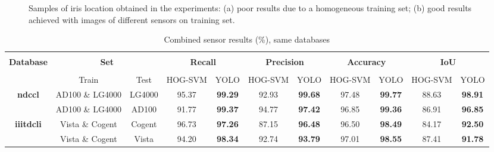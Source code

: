 \documentclass[conference]{IEEEtran}
\begin{document}
\begin{figure}[!htb]
\centering
{} \vspace{-2mm}

\caption{Samples of iris location obtained in the experiments: (a) poor results due to a homogeneous training set; (b) good results achieved with images of different sensors on training set.}
\end{figure}


\begin{table*}[!ht]
	\centering
	\caption{Combined sensor results (\%), same databases}
	\label{tab:combined}
	\begin{tabular}{c c c c c c c c c c c}\hline  \\[\dimexpr-\normalbaselineskip+4pt]

		 \multirow{2}{*}{\textbf{Database}} & \multicolumn{2}{c}{\textbf{Set}} & \multicolumn{2}{c}{\textbf{Recall}} & \multicolumn{2}{c}{\textbf{Precision}} & \multicolumn{2}{c}{\textbf{Accuracy}} & \multicolumn{2}{c}{\textbf{IoU}} \\
		 \\[\dimexpr-\normalbaselineskip+2pt] 
		 
		          & Train & Test  & HOG-SVM & YOLO & HOG-SVM & YOLO & HOG-SVM & YOLO & HOG-SVM & YOLO \\ \toprule

		\multirow{2}{*}{\textbf{\gls*{ndccl}}}     & AD100 \& LG4000 & LG4000  & 95.37  & \textbf{99.29} & 92.93 & \textbf{99.68} & 97.48 & \textbf{99.77} & 88.63 & \textbf{98.91}  \\ 
		                   & AD100 \& LG4000 & AD100   & 91.77  & \textbf{99.37} & 94.77 & \textbf{97.42} & 96.85 & \textbf{99.36} & 86.91 & \textbf{96.85}  \\ \midrule
		\multirow{2}{*}{\textbf{\gls*{iiitdcli}}} & Vista \& Cogent & Cogent  & 96.73  & \textbf{97.26} & 87.15 & \textbf{96.48} & 96.50 & \textbf{98.49} & 84.17 & \textbf{92.50}  \\ 
		                   & Vista \& Cogent & Vista   & 94.20  & \textbf{98.34} & 92.74 & \textbf{93.79} & 97.01 & \textbf{98.55} & 87.41 & \textbf{91.78}  \\ \bottomrule
		
	\end{tabular}
\end{table*}
\end{document}
